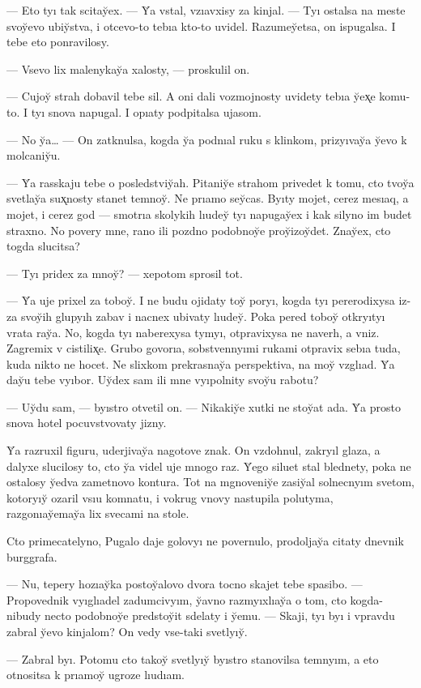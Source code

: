 \documentclass[10pt]{book}
\begin{document}
— Eto tyı tak scitay̆ex. — Y̆a vstal, vzıavxisy za kinjal. — Tyı ostalsa na meste svoy̆evo ubiy̆stva, i otcevo-to tebıa kto-to uvidel. Razumey̆etsa, on ispugalsa. I tebe eto ponravilosy.

— Vsevo lix malenykay̆a xalosty, — proskulil on.

— Cujoy̆ strah dobavil tebe sil. A oni dali vozmojnosty uvidety tebıa y̆ex̨e komu-to. I tyı snova napugal. I opıaty podpitalsa ujasom.

— No y̆a… — On zatknulsa, kogda y̆a podnıal ruku s klinkom, prizyıvay̆a y̆evo k molcaniy̆u.

— Y̆a rasskaju tebe o posledstviy̆ah. Pitaniy̆e strahom privedet k tomu, cto tvoy̆a svetlay̆a sux̨nosty stanet temnoy̆. Ne prıamo sey̆cas. Byıty mojet, cerez mesıaq, a mojet, i cerez god — smotrıa skolykih lıudey̆ tyı napugay̆ex i kak silyno im budet straxno. No povery mne, rano ili pozdno podobnoy̆e proy̆izoy̆det. Znay̆ex, cto togda slucitsa?

— Tyı pridex za mnoy̆? — xepotom sprosil tot.

— Y̆a uje prixel za toboy̆. I ne budu ojidaty toy̆ poryı, kogda tyı pererodixysa iz-za svoy̆ih glupyıh zabav i nacnex ubivaty lıudey̆. Poka pered toboy̆ otkryıtyı vrata ray̆a. No, kogda tyı naberexysa tymyı, otpravixysa ne naverh, a vniz. Zagremix v cistilix̨e. Grubo govorıa, sobstvennyımi rukami otpravix sebıa tuda, kuda nikto ne hocet. Ne slixkom prekrasnay̆a perspektiva, na moy̆ vzglıad. Y̆a day̆u tebe vyıbor. Uy̆dex sam ili mne vyıpolnity svoy̆u rabotu?

— Uy̆du sam, — byıstro otvetil on. — Nikakiy̆e xutki ne stoy̆at ada. Y̆a prosto snova hotel pocuvstvovaty jizny.

Y̆a razruxil figuru, uderjivay̆a nagotove znak. On vzdohnul, zakryıl glaza, a dalyxe slucilosy to, cto y̆a videl uje mnogo raz. Y̆ego siluet stal blednety, poka ne ostalosy y̆edva zametnovo kontura. Tot na mgnoveniy̆e zasiy̆al solnecnyım svetom, kotoryıy̆ ozaril vsıu komnatu, i vokrug vnovy nastupila polutyma, razgonıay̆emay̆a lix svecami na stole.

Cto primecatelyno, Pugalo daje golovyı ne povernulo, prodoljay̆a citaty dnevnik burggrafa.

— Nu, tepery hozıay̆ka postoy̆alovo dvora tocno skajet tebe spasibo. — Propovednik vyıglıadel zadumcivyım, y̆avno razmyıxlıay̆a o tom, cto kogda-nibudy necto podobnoy̆e predstoy̆it sdelaty i y̆emu. — Skaji, tyı byı i vpravdu zabral y̆evo kinjalom? On vedy vse-taki svetlyıy̆.

— Zabral byı. Potomu cto takoy̆ svetlyıy̆ byıstro stanovilsa temnyım, a eto otnositsa k prıamoy̆ ugroze lıudıam.
\end{document}
